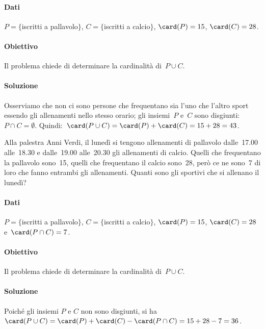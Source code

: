 \begin{exrig}
\begin{esempio}
\paragraph{Dati} $P=\{$iscritti a pallavolo$\}$, $C=\{$iscritti a calcio$\}$, $\card(P)=15$, $\card(C)=28$.
\paragraph{Obiettivo} Il problema chiede di determinare la cardinalità di~$P\cup C$.
\paragraph{Soluzione} Osserviamo che non ci sono persone che frequentano sia
l'uno che l'altro sport essendo gli allenamenti nello stesso orario; gli insiemi~$P$ e~$C$
sono disgiunti:~$P\cap C=\emptyset $. Quindi:~$\card(P\cup C)=\card(P)+\card(C)=15+28=43$.
\end{esempio}

\begin{esempio}
\begin{multicols}{2}
 Alla palestra Anni Verdi, il lunedì si tengono allenamenti di pallavolo dalle~17.00 alle~18.30 e dalle~19.00 alle~20.30 gli
allenamenti di calcio. Quelli che frequentano la pallavolo sono~15, quelli che frequentano il calcio sono~28, però ce ne sono~7 di loro
che fanno entrambi gli allenamenti. Quanti sono gli sportivi che si allenano il lunedì?
\begin{center}
 
 \end{center}
\end{multicols}
\paragraph{Dati} $P=\{$iscritti a pallavolo$\}$, $C=\{$iscritti a calcio$\}$, $\card(P)=15$, $\card(C)=28$ e~$\card(P\cap C)=7$.\paragraph{Obiettivo} Il problema chiede di determinare la cardinalità di~$P\cup C$.
\paragraph{Soluzione} Poiché gli insiemi $P$ e $C$ non sono disgiunti, si ha $\card(P\cup C)=\card(P)+\card(C)-\card(P\cap C)=15+28-7=36$.


\end{esempio}
\end{exrig}
